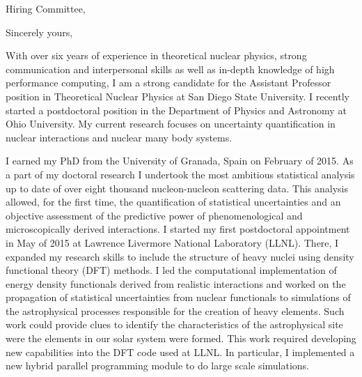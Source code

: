 
\date{\today}
\opening{Hiring Committee,}
\closing{Sincerely yours,}
\makelettertitle

With over six years of experience in theoretical nuclear physics,
strong communication and interpersonal skills as well as in-depth
knowledge of high performance computing, I am a strong candidate for
the Assistant Professor position in Theoretical Nuclear Physics at San
Diego State University. I recently started a postdoctoral position in
the Department of Physics and Astronomy at Ohio University. My current
research focuses on uncertainty quantification in nuclear
interactions and nuclear many body systems.


I earned my PhD from the University of Granada, Spain on February of
2015. As a part of my doctoral research I undertook the most ambitious
statistical analysis up to date of over eight thousand nucleon-nucleon
scattering data.  This analysis allowed, for the first time, the
quantification of statistical uncertainties and an objective
assessment of the predictive power of phenomenological and
microscopically derived interactions. I started my first postdoctoral
appointment in May of 2015 at Lawrence Livermore National Laboratory
(LLNL). There, I expanded my research skills to include the structure
of heavy nuclei using density functional theory (DFT) methods. I led
the computational implementation of energy density functionals derived
from realistic interactions and worked on the propagation of
statistical uncertainties from nuclear functionals to simulations of
the astrophysical processes responsible for the creation of heavy
elements. Such work could provide clues to identify the
characteristics of the astrophysical site were the elements in our
solar system were formed. This work required developing new
capabilities into the DFT code used at LLNL. In particular, I
implemented a new hybrid parallel programming module to do large scale
simulations.


